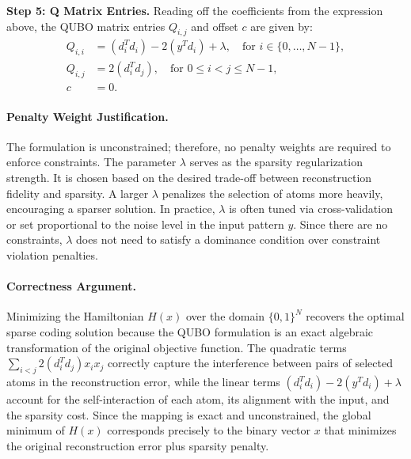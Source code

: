 \documentclass[12pt]{article}
\begin{document}
\textbf{Step 5: Q Matrix Entries.}
Reading off the coefficients from the expression above, the QUBO matrix entries $Q_{i,j}$ and offset $c$ are given by:
\begin{align}
    Q_{i,i} &= (d_i^T d_i) - 2 (y^T d_i) + \lambda, \quad \text{for } i \in \{0, \dots, N-1\}, \\
    Q_{i,j} &= 2 (d_i^T d_j), \quad \text{for } 0 \leq i < j \leq N-1, \\
    c &= 0.
\end{align}

\paragraph{Penalty Weight Justification.}
The formulation is unconstrained; therefore, no penalty weights are required to enforce constraints. The parameter $\lambda$ serves as the sparsity regularization strength. It is chosen based on the desired trade-off between reconstruction fidelity and sparsity. A larger $\lambda$ penalizes the selection of atoms more heavily, encouraging a sparser solution. In practice, $\lambda$ is often tuned via cross-validation or set proportional to the noise level in the input pattern $y$. Since there are no constraints, $\lambda$ does not need to satisfy a dominance condition over constraint violation penalties.

\paragraph{Correctness Argument.}
Minimizing the Hamiltonian $H(x)$ over the domain $\{0,1\}^N$ recovers the optimal sparse coding solution because the QUBO formulation is an exact algebraic transformation of the original objective function. The quadratic terms $\sum_{i<j} 2(d_i^T d_j)x_i x_j$ correctly capture the interference between pairs of selected atoms in the reconstruction error, while the linear terms $(d_i^T d_i) - 2(y^T d_i) + \lambda$ account for the self-interaction of each atom, its alignment with the input, and the sparsity cost. Since the mapping is exact and unconstrained, the global minimum of $H(x)$ corresponds precisely to the binary vector $x$ that minimizes the original reconstruction error plus sparsity penalty.
\end{document}
